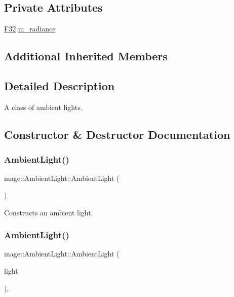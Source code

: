 \subsection*{Private Attributes}
\begin{DoxyCompactItemize}
\item 
\hyperlink{namespacemage_aa97e833b45f06d60a0a9c4fc22ae02c0}{F32} \hyperlink{classmage_1_1_ambient_light_a579aff19284637d89d85026b373574aa}{m\+\_\+radiance}
\end{DoxyCompactItemize}
\subsection*{Additional Inherited Members}


\subsection{Detailed Description}
A class of ambient lights. 

\subsection{Constructor \& Destructor Documentation}
\hypertarget{classmage_1_1_ambient_light_a9f1aa7ecfbb56ecc10f8d149272e0f51}{}\label{classmage_1_1_ambient_light_a9f1aa7ecfbb56ecc10f8d149272e0f51} 
\subsubsection{\texorpdfstring{Ambient\+Light()}{AmbientLight()}\hspace{0.1cm}{\footnotesize\ttfamily [1/3]}}
{\footnotesize\ttfamily mage\+::\+Ambient\+Light\+::\+Ambient\+Light (\begin{DoxyParamCaption}{ }\end{DoxyParamCaption})\hspace{0.3cm}{\ttfamily [noexcept]}}

Constructs an ambient light. \hypertarget{classmage_1_1_ambient_light_acd05bee97c195c1a18242879008bf4ae}{}\label{classmage_1_1_ambient_light_acd05bee97c195c1a18242879008bf4ae} 
\subsubsection{\texorpdfstring{Ambient\+Light()}{AmbientLight()}\hspace{0.1cm}{\footnotesize\ttfamily [2/3]}}
{\footnotesize\ttfamily mage\+::\+Ambient\+Light\+::\+Ambient\+Light (\begin{DoxyParamCaption}\item[{const \hyperlink{classmage_1_1_ambient_light}{Ambient\+Light} \&}]{light }\end{DoxyParamCaption})\hspace{0.3cm}{\ttfamily [default]}, {\ttfamily [noexcept]}}

